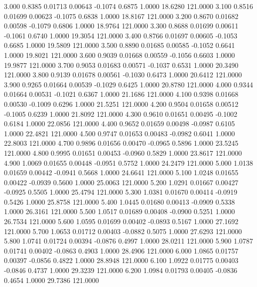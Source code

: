    3.000   0.8385   0.01713   0.00643  -0.1074   0.6875   1.0000  18.6280 121.0000
   3.100   0.8516   0.01699   0.00623  -0.1075   0.6838   1.0000  18.8167 121.0000
   3.200   0.8670   0.01682   0.00598  -0.1079   0.6806   1.0000  18.9764 121.0000
   3.300   0.8688   0.01699   0.00611  -0.1061   0.6740   1.0000  19.3054 121.0000
   3.400   0.8766   0.01697   0.00605  -0.1053   0.6685   1.0000  19.5809 121.0000
   3.500   0.8890   0.01685   0.00585  -0.1052   0.6641   1.0000  19.8021 121.0000
   3.600   0.9039   0.01668   0.00559  -0.1056   0.6603   1.0000  19.9877 121.0000
   3.700   0.9053   0.01683   0.00571  -0.1037   0.6531   1.0000  20.3490 121.0000
   3.800   0.9139   0.01678   0.00561  -0.1030   0.6473   1.0000  20.6412 121.0000
   3.900   0.9265   0.01664   0.00539  -0.1029   0.6425   1.0000  20.8780 121.0000
   4.000   0.9344   0.01664   0.00531  -0.1021   0.6367   1.0000  21.1686 121.0000
   4.100   0.9398   0.01668   0.00530  -0.1009   0.6296   1.0000  21.5251 121.0000
   4.200   0.9504   0.01658   0.00512  -0.1005   0.6239   1.0000  21.8092 121.0000
   4.300   0.9610   0.01651   0.00495  -0.1002   0.6184   1.0000  22.0856 121.0000
   4.400   0.9652   0.01659   0.00498  -0.0987   0.6105   1.0000  22.4821 121.0000
   4.500   0.9747   0.01653   0.00483  -0.0982   0.6041   1.0000  22.8003 121.0000
   4.700   0.9896   0.01656   0.00470  -0.0965   0.5896   1.0000  23.5245 121.0000
   4.800   0.9995   0.01651   0.00453  -0.0960   0.5829   1.0000  23.8617 121.0000
   4.900   1.0069   0.01655   0.00448  -0.0951   0.5752   1.0000  24.2479 121.0000
   5.000   1.0138   0.01659   0.00442  -0.0941   0.5668   1.0000  24.6641 121.0000
   5.100   1.0248   0.01655   0.00422  -0.0939   0.5600   1.0000  25.0063 121.0000
   5.200   1.0291   0.01667   0.00427  -0.0925   0.5505   1.0000  25.4794 121.0000
   5.300   1.0381   0.01670   0.00414  -0.0919   0.5426   1.0000  25.8758 121.0000
   5.400   1.0445   0.01680   0.00413  -0.0909   0.5338   1.0000  26.3161 121.0000
   5.500   1.0517   0.01689   0.00408  -0.0900   0.5251   1.0000  26.7534 121.0000
   5.600   1.0595   0.01699   0.00402  -0.0893   0.5167   1.0000  27.1692 121.0000
   5.700   1.0653   0.01712   0.00403  -0.0882   0.5075   1.0000  27.6293 121.0000
   5.800   1.0741   0.01724   0.00394  -0.0876   0.4997   1.0000  28.0211 121.0000
   5.900   1.0787   0.01741   0.00402  -0.0863   0.4903   1.0000  28.4906 121.0000
   6.000   1.0865   0.01757   0.00397  -0.0856   0.4822   1.0000  28.8948 121.0000
   6.100   1.0922   0.01775   0.00403  -0.0846   0.4737   1.0000  29.3239 121.0000
   6.200   1.0984   0.01793   0.00405  -0.0836   0.4654   1.0000  29.7386 121.0000
